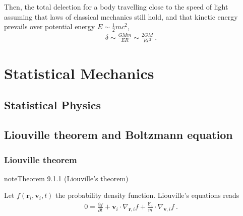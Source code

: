 \documentclass[letterpaper,10pt,english]{jupyterBook}
\begin{document}
\sphinxAtStartPar
Then, the total delection for a body travelling close to the speed of light \sphinxhyphen{} assuming that laws of classical mechanics still hold, and that kinetic energy prevails over potential energy \sphinxhyphen{} \(E \sim \frac{1}{2} m c^2\),
\begin{equation}\label{equation:ch/relativity-general/rays-of-light-deflection:eq:rays-of-light-deflection:classical}
\begin{split}\delta \sim \frac{GMm}{ER} \sim \frac{2GM}{R c^2} \ .\end{split}
\end{equation}
\sphinxstepscope


\part{Statistical Mechanics}

\sphinxstepscope


\chapter{Statistical Physics}
\label{\detokenize{ch/statistical-mechanics/intro:statistical-physics}}\label{\detokenize{ch/statistical-mechanics/intro:statistical-mechanics-intro}}\label{\detokenize{ch/statistical-mechanics/intro::doc}}
\sphinxstepscope


\chapter{Liouville theorem and Boltzmann equation}
\label{\detokenize{ch/statistical-mechanics/liouville-boltzmann:liouville-theorem-and-boltzmann-equation}}\label{\detokenize{ch/statistical-mechanics/liouville-boltzmann:statistical-mechanics-liouville-boltzmann}}\label{\detokenize{ch/statistical-mechanics/liouville-boltzmann::doc}}

\section{Liouville theorem}
\label{\detokenize{ch/statistical-mechanics/liouville-boltzmann:liouville-theorem}}\label{\detokenize{ch/statistical-mechanics/liouville-boltzmann:statistical-mechanics-liouville}}\label{ch/statistical-mechanics/liouville-boltzmann:theorem-0}
\begin{sphinxadmonition}{note}{Theorem 9.1.1 (Liouville’s theorem)}



\sphinxAtStartPar
Let \(f(\mathbf{r}_i, \mathbf{v}_i, t)\) the  probability density function. Liouville’s equations reads
\begin{equation*}
\begin{split}
0 = \frac{\partial f}{\partial t} + \mathbf{v}_i \cdot \nabla_{\mathbf{r},i} f + \frac{\mathbf{F}_i}{m} \cdot \nabla_{\mathbf{v},i} f \ .
\end{split}
\end{equation*}\end{sphinxadmonition}
\end{document}
